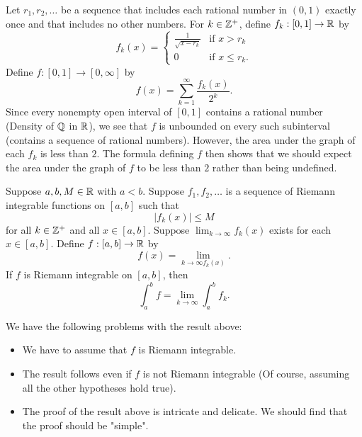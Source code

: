 \documentclass[11pt,a4paper]{book}
\begin{document}
\begin{eg}
    Let \( {r}_{1}, {r}_{2}, \dots \) be a sequence that includes each rational number in \( (0,1) \) exactly once and that includes no other numbers. For \( k \in \mathbb{Z}^{+} \), define \( {f}_{k} : [0,1] \to \mathbb{R}  \) by 
    \[  {f}_{k}(x) = 
    \begin{cases}
        \frac{ 1 }{ \sqrt{ x - {r}_{k} }  }  & \text{if } x > {r}_{k} \\
        0 & \text{if } x \leq {r}_{k}.
    \end{cases} \]
    Define \( f:[0,1] \to [0,\infty ] \) by 
    \[  f(x) = \sum_{ k=1  }^{ \infty   } \frac{ {f}_{k}(x) }{ 2^{k} }. \]
    Since every nonempty open interval of \( [0,1] \) contains a rational number (Density of \( \mathbb{Q}  \) in \( \mathbb{R} \)), we see that \( f  \) is unbounded on every such subinterval (contains a sequence of rational numbers). However, the area under the graph of each \( {f}_{k} \) is less than \( 2  \). The formula defining \( f  \) then shows that we should expect the area under the graph of \( f  \) to be less than \( 2  \) rather than being undefined. 
\end{eg}

\begin{prop}
    Suppose \( a,b,M \in \mathbb{R}  \) with \( a < b  \). Suppose \( {f}_{1}, {f}_{2}, \dots  \) is a sequence of Riemann integrable functions on \( [a,b] \) such that   
    \[  | {f}_{k }(x)| \leq  M   \] for all \( k \in \mathbb{Z}^{+}   \) and all \(  x \in [a,b] \). Suppose \( \lim_{ k  \to  \infty  }  {f}_{k}(x) \) exists for each \( x \in [a,b] \). Define \( f: [a,b] \to \mathbb{R}  \) by
    \[  f(x) = \lim_{ k  \to  \infty  {f}_{k}(x) }.  \] 
    If \( f \) is Riemann integrable on \( [a,b] \), then
    \[  \int_{ a }^{ b } f = \lim_{ k  \to  \infty   }  \int_{ a }^{ b }  {f}_{k}. \]
\end{prop}

We have the following problems with the result above:

\begin{itemize}
    \item We have to assume that \( f  \) is Riemann integrable. 
    \item The result follows even if \( f  \) is not Riemann integrable (Of course, assuming all the other hypotheses hold true). 
    \item The proof of the result above is intricate and delicate. We should find that the proof should be "simple".
\end{itemize}
\end{document}
